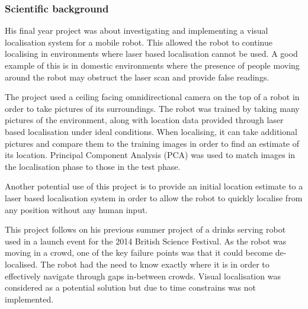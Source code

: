 \subsubsection*{Scientific background}
 
His final year project was about investigating and implementing a visual localisation system for a mobile robot. This allowed the robot to continue localising in environments where laser based localisation cannot be used. A good example of this is in domestic environments where the presence of people moving around the robot may obstruct the laser scan and provide false readings.
 
The project used a ceiling facing omnidirectional camera on the top of a robot in order to take pictures of its surroundings.
The robot was trained by taking many pictures of the environment, along with location data provided through laser based localisation under ideal conditions. When localising, it can take additional pictures and compare them to the training images in order to find an estimate of its location. Principal Component Analysis (PCA) was used to match images in the localisation phase to those in the test phase. 

Another potential use of this project is to provide an initial location estimate to a laser based localisation system in order to allow the robot to quickly localise from any position without any human input.

This project follows on his previous summer project of a drinks serving robot used in a launch event for the 2014 British Science Festival. As the robot was moving in a crowd, one of the key failure points was that it could become de-localised. The robot had the need to know exactly where it is in order to effectively navigate through gaps in-between crowds. Visual localisation was considered as a potential solution but due to time constrains was not implemented.